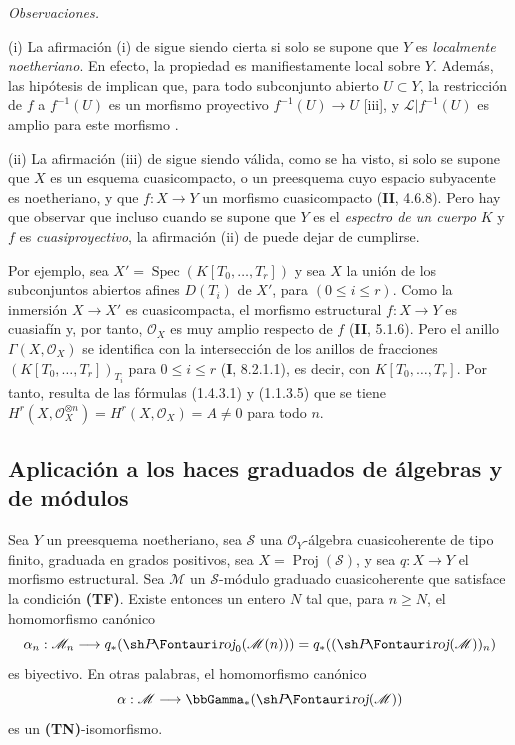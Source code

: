 \begin{env}[2.2.5]
\label{III.2.2.5}
\label{III.2.2.5-fr}
\emph{Observaciones.}

(i) La afirmación (i) de  sigue siendo cierta si solo se supone que $Y$ es \emph{localmente noetheriano}.
En efecto, la propiedad es manifiestamente local sobre $Y$.
Además, las hipótesis de  implican que, para todo subconjunto abierto $U\subset Y$, la restricción de $f$ a $f^{-1}(U)$ es un morfismo proyectivo
$f^{-1}(U)\to U$
[iii], y $\mathcal L|f^{-1}(U)$ es amplio para este morfismo .

(ii) La afirmación (iii) de  sigue siendo válida, como se ha visto, si solo se supone que $X$ es un esquema cuasicompacto, o un preesquema cuyo espacio subyacente es noetheriano, y que $f:X\to Y$ un morfismo cuasicompacto (\textbf{II}, 4.6.8). Pero hay que observar que incluso cuando se supone que $Y$ es el \emph{espectro de un cuerpo} $K$ y $f$ es \emph{cuasiproyectivo}, la afirmación (ii) de  puede dejar de cumplirse.

Por ejemplo, sea
$X'=\operatorname{Spec}(K[T_0,\ldots,T_r])$
y sea $X$ la unión de los subconjuntos abiertos afines $D(T_i)$ de $X'$, para $(0\leq i\leq r)$.
Como la inmersión $X\to X'$ es cuasicompacta, el morfismo estructural $f:X\to Y$ es cuasiafín  y, por tanto, $\mathcal O_X$ es muy amplio respecto de $f$ (\textbf{II}, 5.1.6). Pero el anillo
$\Gamma(X,\mathcal O_X)$ se identifica con la intersección de los anillos de
fracciones $(K[T_0,\ldots,T_r])_{T_i}$ para $0\leq i\leq r$
(\textbf{I}, 8.2.1.1), es decir, con $K[T_0,\ldots,T_r]$. Por tanto, resulta
de las fórmulas (1.4.3.1) y (1.1.3.5) que se tiene
$H^r(X,\mathcal O_X^{\otimes n})=H^r(X,\mathcal O_X)=A\neq0$
para todo $n$.
\end{env}


\subsection{Aplicación a los haces graduados de álgebras y de módulos}
\label{subsection:III.2.3}
\label{subsection:III.2.3-fr}

\begin{theorem}[2.3.1]
\label{III.2.3.1}
\label{III.2.3.1-fr}
Sea $Y$ un preesquema noetheriano, sea $\mathcal S$ una $\mathcal O_Y$-álgebra cuasicoherente de tipo finito, graduada en grados positivos, sea
$X=\operatorname{Proj}(\mathcal S)$,
y sea $q:X\to Y$ el morfismo estructural.
Sea $\mathcal M$ un $\mathcal S$-módulo graduado cuasicoherente que satisface la condición \textup{\textbf{(TF)}}.
Existe entonces un entero $N$ tal que, para $n\geq N$, el homomorfismo canónico \textup{}
\[
\alpha_n:\mathcal M_n\longrightarrow
q_*(\shProj_0(\mathcal M(n)))
=q_*((\shProj(\mathcal M))_n)
\]
es biyectivo.
En otras palabras, el homomorfismo canónico
\[
\alpha:\mathcal M\longrightarrow\bbGamma_*(\shProj(\mathcal M))
\]
es un \textup{\textbf{(TN)}}-isomorfismo.
\end{theorem}

